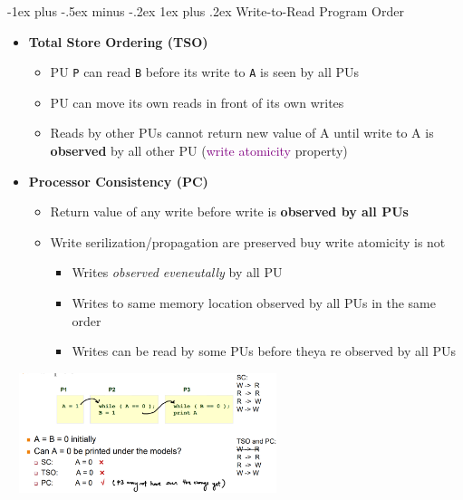 \documentclass[10pt,landscape]{article}
\makeatletter
\newcommand{\subsubsubsection}{\@startsection{subsubsection}{3}{0mm}%
                                {-1ex plus -.5ex minus -.2ex}%
                                {1ex plus .2ex}%
                                {\normalfont\scriptsize\bfseries}}
\makeatother
\begin{document}
\begin{multicols*}{3}
\subsubsubsection{Write-to-Read Program Order}
\begin{itemize}[topsep=0pt,noitemsep,wide=0pt, leftmargin=\dimexpr{} + 2\relax]
    \item \textbf{Total Store Ordering (TSO)}
    \begin{itemize}[topsep=0pt,noitemsep,wide=0pt, leftmargin=\dimexpr{} + 2\relax]
        \item PU \verb|P| can read \verb|B| before its write to \verb|A| is seen by all PUs
        \item PU can move its own reads in front of its own writes
        \item Reads by other PUs cannot return new value of A until write to A is \textbf{observed} by all other PU (\textcolor{purple}{write atomicity} property)
    \end{itemize}
    \item \textbf{Processor Consistency (PC)}
    \begin{itemize}[topsep=0pt,noitemsep,wide=0pt, leftmargin=\dimexpr{} + 2\relax]
        \item Return value of any write before write is \textbf{observed by all PUs}
        \item Write serilization/propagation are preserved buy write atomicity is not
        \begin{itemize}[topsep=0pt,noitemsep,wide=0pt, leftmargin=\dimexpr{} + 2\relax]
            \item Writes \textit{observed eveneutally} by all PU
            \item Writes to same memory location observed by all PUs in the same order
            \item Writes can be read by some PUs before theya re observed by all PUs
        \end{itemize}
    \end{itemize}
\end{itemize}

\includegraphics*[width=8.2cm, height=3.5cm]{images/writeotoread.PNG}


\end{multicols*}
\end{document}
